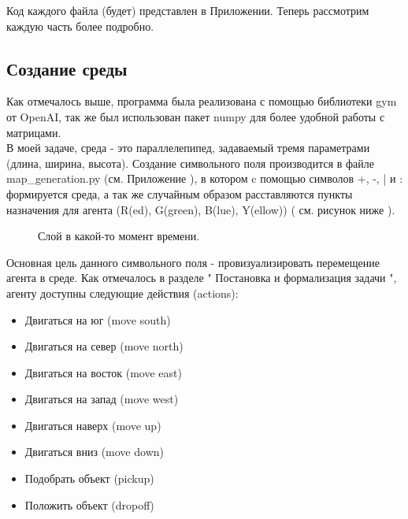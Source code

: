 \documentclass[12pt, a4paper]{report}
\theoremstyle{definition}
\theoremstyle{plain}
\theoremstyle{remark}
\theoremstyle{remark}
\theoremstyle{definition}
\begin{document}
Код каждого файла (будет) представлен в Приложении.
Теперь рассмотрим каждую часть более подробно.
\subsection{Создание среды}

Как отмечалось выше, программа была реализована с помощью библиотеки gym от OpenAI, так же был использован пакет numpy для более удобной работы с матрицами. \\
В моей задаче, среда - это параллелепипед, задаваемый тремя параметрами (длина, ширина, высота). Создание символьного поля производится в файле map\_generation.py (см. Приложение ), в котором c помощью символов +, -, | и : формируется среда, а так же случайным образом расставляются пункты назначения для агента (R(ed), G(green), B(lue), Y(ellow)) ( см. рисунок ниже ).
\begin{figure}[h!]
	\caption{Слой в какой-то момент времени.}
\end{figure}

Основная цель данного символьного поля - провизуализировать перемещение агента в среде. Как отмечалось в разделе " Постановка и формализация задачи ", агенту доступны следующие действия (actions):
\begin{itemize}
\item Двигаться на юг (move south)
\item Двигаться на север (move north)
\item Двигаться на восток (move east)
\item Двигаться на запад (move west)
\item Двигаться наверх (move up)
\item Двигаться вниз (move down)
\item Подобрать объект (pickup)
\item Положить объект (dropoff)
 \end{itemize}
\end{document}
